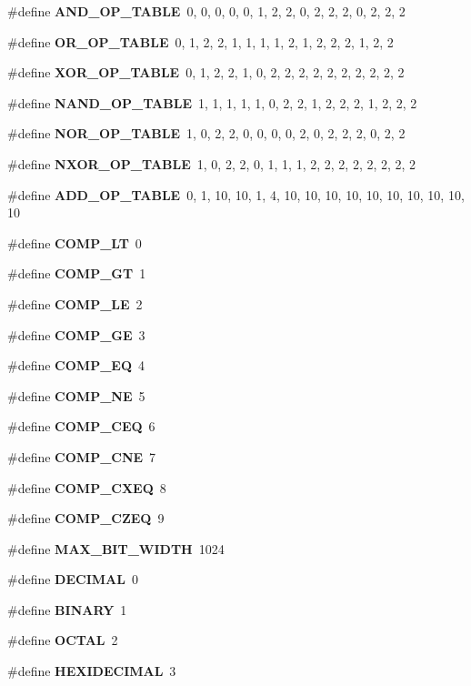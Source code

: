 \begin{CompactItemize}
\#define {\bf AND\_\-OP\_\-TABLE}\ 0,  0,  0,  0,  0,  1,  2,  2,  0,  2,  2,  2,  0,  2,  2,  2
\item 
\#define {\bf OR\_\-OP\_\-TABLE}\ 0,  1,  2,  2,  1,  1,  1,  1,  2,  1,  2,  2,  2,  1,  2,  2
\item 
\#define {\bf XOR\_\-OP\_\-TABLE}\ 0,  1,  2,  2,  1,  0,  2,  2,  2,  2,  2,  2,  2,  2,  2,  2
\item 
\#define {\bf NAND\_\-OP\_\-TABLE}\ 1,  1,  1,  1,  1,  0,  2,  2,  1,  2,  2,  2,  1,  2,  2,  2
\item 
\#define {\bf NOR\_\-OP\_\-TABLE}\ 1,  0,  2,  2,  0,  0,  0,  0,  2,  0,  2,  2,  2,  0,  2,  2
\item 
\#define {\bf NXOR\_\-OP\_\-TABLE}\ 1,  0,  2,  2,  0,  1,  1,  1,  2,  2,  2,  2,  2,  2,  2,  2
\item 
\#define {\bf ADD\_\-OP\_\-TABLE}\ 0,  1,  10, 10, 1,  4,  10, 10, 10, 10, 10, 10, 10, 10, 10, 10
\item 
\#define {\bf COMP\_\-LT}\ 0
\item 
\#define {\bf COMP\_\-GT}\ 1
\item 
\#define {\bf COMP\_\-LE}\ 2
\item 
\#define {\bf COMP\_\-GE}\ 3
\item 
\#define {\bf COMP\_\-EQ}\ 4
\item 
\#define {\bf COMP\_\-NE}\ 5
\item 
\#define {\bf COMP\_\-CEQ}\ 6
\item 
\#define {\bf COMP\_\-CNE}\ 7
\item 
\#define {\bf COMP\_\-CXEQ}\ 8
\item 
\#define {\bf COMP\_\-CZEQ}\ 9
\item 
\#define {\bf MAX\_\-BIT\_\-WIDTH}\ 1024
\item 
\#define {\bf DECIMAL}\ 0
\item 
\#define {\bf BINARY}\ 1
\item 
\#define {\bf OCTAL}\ 2
\item 
\#define {\bf HEXIDECIMAL}\ 3
\end{CompactItemize}
